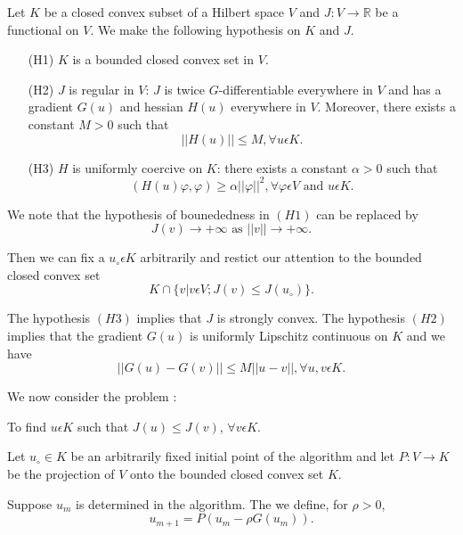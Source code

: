 Let $K$ be a closed convex subset of a Hilbert space $V$ and $J : V \to \mathbb{R}$ be a functional on $V$. We make the following hypothesis on $K$ and $J$.
\begin{enumerate}
\item[(H1)] $K$ is a bounded closed convex set in $V$.

\item[(H2)] $J$ is regular in $V$: $J$ is twice $G$-differentiable everywhere in $V$ and has a gradient $G(u)$ and hessian $H(u)$ everywhere in $V$. Moreover, there exists a constant $M > 0$ such that
$$
||H(u)|| \leq M, \forall u \epsilon K.
$$

\item[(H3)] $H$ is uniformly coercive on $K$: there exists a constant $\alpha > 0$ such that
$$
(H(u) \varphi, \varphi) \geq \alpha ||\varphi||^{2}, \forall \varphi \epsilon V \text{ and } u \epsilon K.
$$\pageoriginale
\end{enumerate}

We note that the hypothesis of bounededness in $(H1)$ can be replaced by
\begin{equation*}
J(v) \to + \infty \text{ as } ||v|| \to + \infty.\tag*{$(H1)'$}\label{chap4-eqH1'}
\end{equation*}

Then we can fix a $u_{\circ} \epsilon K$ arbitrarily and restict our attention to the bounded closed convex set
$$
K \cap \{v | v \epsilon V ; J(v) \leq J(u_{\circ})\}.
$$

The hypothesis $(H3)$ implies that $J$ is strongly convex. The hypothesis $(H2)$ implies that the gradient $G(u)$ is uniformly Lipschitz continuous on $K$ and we have
\begin{equation*}
|| G(u) - G(v) || \leq M ||u-v||, \forall u, v \epsilon K.\tag{3.1}\label{chap4-eq3.1}
\end{equation*}

We now consider the problem :

\begin{problem}\label{chap4-prob3.1}
To find $u \epsilon K$ such that $J(u) \leq J(v)$, $\forall v \epsilon K$.
\end{problem}

\medskip
{} Let $u_{\circ} \in K$ be an arbitrarily fixed initial point of the algorithm and let $P : V \to K$ be the projection of $V$ onto the bounded closed convex set $K$.

Suppose $u_{m}$ is determined in the algorithm. The we define, for $\rho > 0$,
\begin{equation*}
u_{m+1} = P(u_{m} - \rho G(u_{m})).\tag{3.2}\label{chap4-eq3.2}
\end{equation*}

